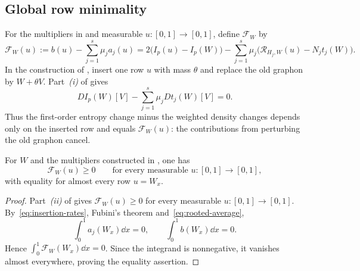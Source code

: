 \subsection{Global row minimality}\label{sec:row-minimality}

For the multipliers in  and measurable $u:[0,1]\to[0,1]$,
define $\mathcal F_W$ by
\begin{equation}\label{eq:row-functional}
  \mathcal F_W(u):=b(u)-\sum_{j=1}^s\mu_j a_j(u)
  =2\bigl(I_p(u)-I_p(W)\bigr)-\sum_{j=1}^s\mu_j\bigl(\mathcal R_{H_j,W}(u)-N_jt_j(W)\bigr).
\end{equation}
In the construction of ,
insert one row $u$ with mass $\theta$ and replace the old graphon by
$W+\theta V$. Part~\textit{(i)} of  gives
\[
  DI_p(W)[V]-\sum_{j=1}^s\mu_jDt_j(W)[V]=0.
\]
Thus the first-order entropy change minus the weighted density changes
depends only on the inserted row and equals $\mathcal F_W(u)$: the
contributions from perturbing the old graphon cancel.

\begin{lemma}\label{lem:global-row-minimality}
For $W$ and the multipliers constructed in
, one has
\begin{equation*}
  \mathcal F_W(u)\ge0
  \qquad\text{for every measurable }u:[0,1]\to[0,1],
\end{equation*}
with equality for almost every row $u=W_x$.
\end{lemma}

\begin{proof}
Part~\textit{(ii)} of  gives
$\mathcal F_W(u)\ge0$ for every measurable $u:[0,1]\to[0,1]$.
By~\eqref{eq:insertion-rates}, Fubini's theorem and~\eqref{eq:rooted-average},
\[
  \int_0^1a_j(W_x)\dd x=0,\qquad \int_0^1b(W_x)\dd x=0.
\]
Hence $\int_0^1\mathcal F_W(W_x)\dd x=0$.  Since the integrand is
nonnegative, it vanishes almost everywhere, proving the equality assertion.
\end{proof}

